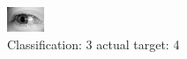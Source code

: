 \begin{figure}[h!]
\begin{center}
\includegraphics[width=0.60\columnwidth]{figures/ID3196_class_3_target_4.png}
\end{center}
\caption{ Classification: 3 actual target: 4}
\label{fig:ID3196_class_3_target_4}
\end{figure}
